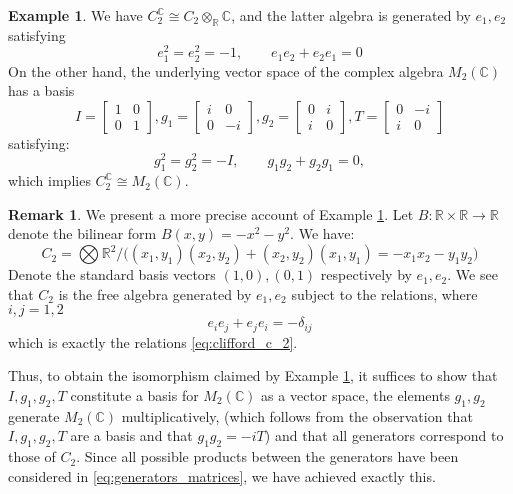 \documentclass[12pt]{article}
\theoremstyle{plain}
\theoremstyle{definition}
\newtheorem{remark}[thm]{Remark}
\newtheorem{example}[thm]{Example}
\newcommand{\bb}[1]{\mathbb{#1}}
\newcommand{\lto}{\longrightarrow}
\begin{document}
\begin{example}\label{ex:em_two}
We have $C_2^{\bb{C}} \cong C_2 \otimes_{\bb{R}}\bb{C}$, and the latter algebra is generated by $e_1,e_2$ satisfying
\begin{equation}\label{eq:clifford_c_2}
e_1^2 = e_2^2 = -1,\qquad e_1e_2 + e_2e_1 = 0
\end{equation}
On the other hand, the underlying vector space of the complex algebra $M_2(\bb{C})$ has a basis
\begin{equation}
I = \begin{bmatrix}
1 & 0\\
0 & 1
\end{bmatrix}
, g_1 = 
\begin{bmatrix}
i & 0\\
0 & -i
\end{bmatrix}, g_2 =
\begin{bmatrix}
0 & i \\
i & 0
\end{bmatrix}, T = 
\begin{bmatrix}
0 & -i\\
i & 0
\end{bmatrix}
\end{equation}
satisfying:
\begin{equation}\label{eq:generators_matrices}
g_1^2 = g_2^2 = -I,\qquad g_1g_2 + g_2g_1 = 0,
\end{equation}
which implies $C_2^{\bb{C}} \cong M_2(\bb{C})$.
\end{example}
\begin{remark}
We present a more precise account of Example \ref{ex:em_two}. Let $B:\bb{R} \times \bb{R} \lto \bb{R}$ denote the bilinear form $B(x,y) = -x^2 - y^2$. We have:
\begin{equation}
C_2 = \bigotimes \bb{R}^2/\big((x_1,y_1)(x_2,y_2) + (x_2,y_2)(x_1,y_1) = -x_1x_2 - y_1y_2\big)
\end{equation}
Denote the standard basis vectors $(1,0),(0,1)$ respectively by $e_1,e_2$. We see that $C_2$ is the free algebra generated by $e_1,e_2$ subject to the relations, where $i,j = 1,2$
\begin{equation}
e_i e_j + e_j e_i = -\delta_{ij}
\end{equation}
which is exactly the relations \eqref{eq:clifford_c_2}.

Thus, to obtain the isomorphism claimed by Example \ref{ex:em_two}, it suffices to show that $I,g_1,g_2,T$ constitute a basis for $M_2(\bb{C})$ as a vector space, the elements $g_1,g_2$ generate $M_2(\bb{C})$ multiplicatively, (which follows from the observation that $I,g_1,g_2,T$ are a basis and that $g_1g_2 = -iT$) and that all generators correspond to those of $C_2$. Since all possible products between the generators have been considered in \eqref{eq:generators_matrices}, we have achieved exactly this.
\end{remark}
\end{document}

